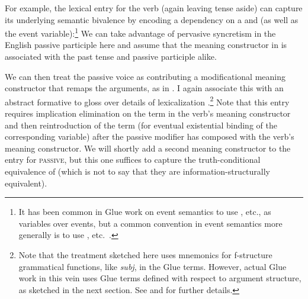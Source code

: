 \documentclass[output=paper,hidelinks]{langscibook}
\begin{document}
For example, the lexical entry for the verb  (again
leaving tense aside) can capture
its underlying semantic bivalence by encoding a dependency on a
 and  (as well as the event
variable):\footnote{It has been common in Glue work on event
  semantics to use , etc., as variables over events,
  but a common convention in event semantics more generally is to use
  , etc.\ \citep[e.g.,][]{champollion17,coppock;champollion20}.}
\ea
\label{ex:hug-lex} 
\z
%
We can take advantage of pervasive syncretism in the English passive
participle here and assume that the meaning constructor in
 is associated with the past tense and passive
participle alike.

We can then treat the passive voice as contributing a modificational meaning
constructor that remaps the arguments, as in . I
again associate this with an abstract formative to gloss over details
of lexicalization \citep[for a related proposal,
see][185--186]{findlay2019}.\footnote{Note that the treatment
  sketched here uses mnemonics for f-structure grammatical functions,
  like \textit{subj}, in the Glue terms. However, actual Glue work in
  this vein uses Glue terms defined with respect to argument
  structure, as sketched in the next section. See
  \citet[75--76]{AsudGior12} and \citet[77ff.]{asudeh2014meaning} for further details.}
\ea
\label{ex:passive-lex} 
\z
%
Note that this entry requires implication elimination on the
 term in the verb's meaning constructor and
then reintroduction of the term (for eventual existential binding of
the corresponding variable) after the passive modifier has composed
with the verb's meaning constructor. We will shortly add a second
meaning constructor to the entry for \textsc{passive}, but this one
suffices to capture the truth-conditional equivalence of
 (which is not to say that they are
information-structurally equivalent).
\end{document}
